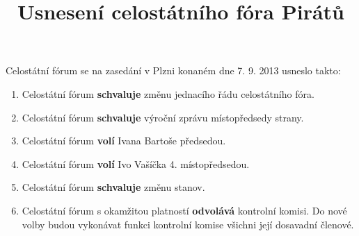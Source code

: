 \documentclass[11pt,a4paper,czech]{article}
\begin{document}
\title{Usnesení celostátního fóra Pirátů}

Celostátní fórum se na zasedání v Plzni konaném dne 7. 9. 2013 usneslo takto:

\begin{enumerate}
\item Celostátní fórum {\bf schvaluje} změnu jednacího řádu celostátního fóra.
\item Celostátní fórum {\bf schvaluje} výroční zprávu místopředsedy strany.
\item Celostátní fórum {\bf volí} Ivana Bartoše předsedou.
\item Celostátní fórum {\bf volí} Ivo Vašíčka 4. místopředsedou.
\item Celostátní fórum {\bf schvaluje} změnu stanov.
\item Celostátní fórum s okamžitou platností {\bf odvolává} kontrolní komisi. Do nové volby budou vykonávat funkci kontrolní komise všichni její dosavadní členové.
\end{enumerate}

\end{document}
